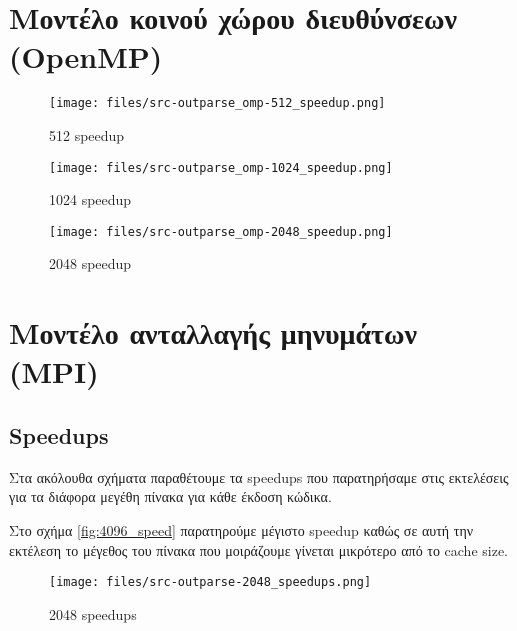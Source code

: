 







\setcounter{section}{1}


\section{Μοντέλο κοινού χώρου διευθύνσεων (\textbf{OpenMP})}

\begin{figure}[H]
    \centering
    \texttt{[image: files/src-outparse\_omp-512\_speedup.png]}
    \caption{512 speedup}
    \label{fig:omp_512_speed}
\end{figure}

\begin{figure}[H]
    \centering
    \texttt{[image: files/src-outparse\_omp-1024\_speedup.png]}
    \caption{1024 speedup}
    \label{fig:omp_1024_speed}
\end{figure}

\begin{figure}[H]
    \centering
    \texttt{[image: files/src-outparse\_omp-2048\_speedup.png]}
    \caption{2048 speedup}
    \label{fig:omp_2048_speed}
\end{figure}




\pagebreak

\section{Μοντέλο ανταλλαγής μηνυμάτων (\textbf{MPI})}

\subsection{Speedups}


Στα ακόλουθα σχήματα παραθέτουμε τα speedups που παρατηρήσαμε στις εκτελέσεις
για τα διάφορα μεγέθη πίνακα για κάθε έκδοση κώδικα.

Στο σχήμα \ref{fig:4096_speed} παρατηρούμε μέγιστο speedup καθώς σε αυτή την
εκτέλεση το μέγεθος του πίνακα που μοιράζουμε γίνεται μικρότερο από το cache
size.

\begin{figure}[H]
    \centering
    \texttt{[image: files/src-outparse-2048\_speedups.png]}
    \caption{2048 speedups}
    \label{fig:2048_speed}
\end{figure}

